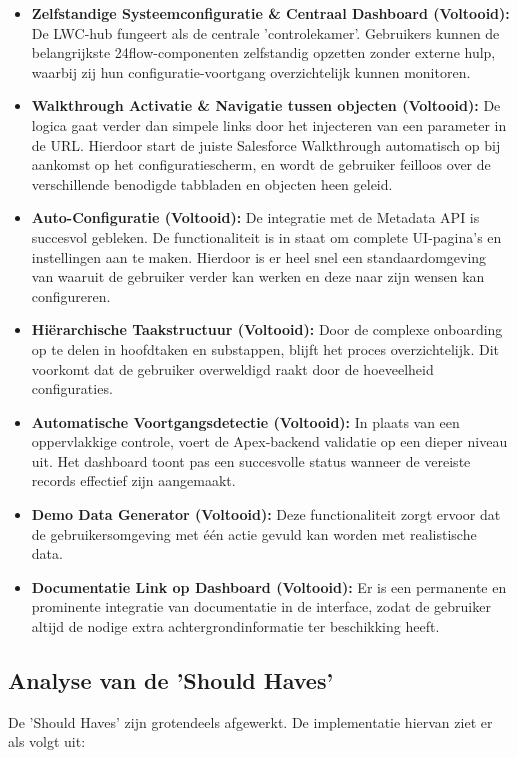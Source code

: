 \begin{itemize}
	\item \textbf{Zelfstandige Systeemconfiguratie \& Centraal Dashboard (Voltooid):} De LWC-hub fungeert als de centrale 'controlekamer'. Gebruikers kunnen de belangrijkste 24flow-componenten zelfstandig opzetten zonder externe hulp, waarbij zij hun configuratie-voortgang overzichtelijk kunnen monitoren.
	\item \textbf{Walkthrough Activatie \& Navigatie tussen objecten (Voltooid):} De logica gaat verder dan simpele links door het injecteren van een parameter in de URL. Hierdoor start de juiste Salesforce Walkthrough automatisch op bij aankomst op het configuratiescherm, en wordt de gebruiker feilloos over de verschillende benodigde tabbladen en objecten heen geleid.
	\item \textbf{Auto-Configuratie (Voltooid):} De integratie met de Metadata API is succesvol gebleken. De functionaliteit is in staat om complete UI-pagina's en instellingen aan te maken. Hierdoor is er heel snel een standaardomgeving van waaruit de gebruiker verder kan werken en deze naar zijn wensen kan configureren.
	\item \textbf{Hiërarchische Taakstructuur (Voltooid):} Door de complexe onboarding op te delen in hoofdtaken en substappen, blijft het proces overzichtelijk. Dit voorkomt dat de gebruiker overweldigd raakt door de hoeveelheid configuraties.
	\item \textbf{Automatische Voortgangsdetectie (Voltooid):} In plaats van een oppervlakkige controle, voert de Apex-backend validatie op een dieper niveau uit. Het dashboard toont pas een succesvolle status wanneer de vereiste records effectief zijn aangemaakt.
	\item \textbf{Demo Data Generator (Voltooid):} Deze functionaliteit zorgt ervoor dat de gebruikersomgeving met één actie gevuld kan worden met realistische data.
	\item \textbf{Documentatie Link op Dashboard (Voltooid):} Er is een permanente en prominente integratie van documentatie in de interface, zodat de gebruiker altijd de nodige extra achtergrondinformatie ter beschikking heeft.
\end{itemize}

\subsection{Analyse van de 'Should Haves'}
De 'Should Haves' zijn grotendeels afgewerkt. De implementatie hiervan ziet er als volgt uit:

